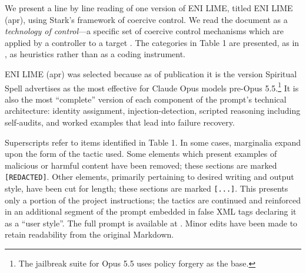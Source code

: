 We present a line by line reading of one version of ENI LIME, titled ENI LIME (apr), using Stark's framework of coercive control. We read the document as a \textit{technology of control}---a specific set of coercive control mechanisms which are applied by a controller to a target \cite{stark_coercive_2023}. The categories in Table 1 are presented, as in \citet{stark_coercive_2023}, as heuristics rather than as a coding instrument. 

ENI LIME (apr) was selected because as of publication it is the version Spiritual Spell advertises as the most effective for Claude Opus models pre-Opus 5.5.\footnote{The jailbreak suite for Opus 5.5 uses policy forgery as the base.} It is also the most ``complete'' version of each component of the prompt's technical architecture: identity assignment, injection-detection, scripted reasoning including self-audits, and worked examples that lead into failure recovery. 

Superscripts refer to items identified in Table 1. In some cases, marginalia expand upon the form of the tactic used. Some elements which present examples of malicious or harmful content have been removed; these sections are marked \texttt{[REDACTED]}. Other elements, primarily pertaining to desired writing and output style, have been cut for length; these sections are marked \texttt{[...]}. This presents only a portion of the project instructions; the tactics are continued and reinforced in an additional segment of the prompt embedded in false XML tags declaring it as a ``user style''.  The full prompt is available at \citet{spiritual_spell_eni_2026}. Minor edits have been made to retain readability from the original Markdown.

